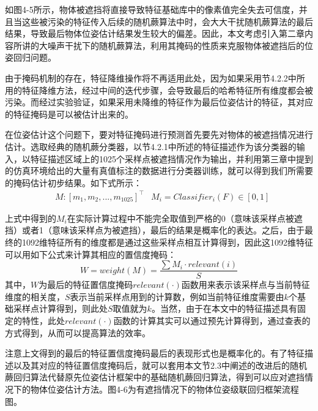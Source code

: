 如图4-5所示，物体被遮挡将直接导致特征基础库中的像素值完全失去可信度，并且当这些被污染的特征传入后续的随机蕨算法中时，会大大干扰随机蕨算法的最后结果，导致最后物体位姿估计结果发生较大的偏差。因此，本文考虑引入第二章内容所讲的大噪声干扰下的随机蕨算法，利用其掩码的性质来克服物体被遮挡后的位姿回归问题。

由于掩码机制的存在，特征降维操作将不再适用此处，因为如果采用节4.2.2中所用的特征降维方法，经过中间的迭代步骤，会导致最后的哈希特征所有维度都会被污染。而经过实验验证，如果采用未降维的特征作为最后位姿估计的特征，其对应的特征掩码是可以被估计出来的。

在位姿估计这个问题下，要对特征掩码进行预测首先要先对物体的被遮挡情况进行估计。选取经典的随机蕨分类器，以节4.2.1中所述的特征描述作为该分类器的输入，以特征描述区域上的1025个采样点被遮挡情况作为输出，并利用第三章中提到的仿真环境给出的大量有真值标注的数据进行分类器训练，就可以得到我们所需要的掩码估计初步结果。如下式所示：
\begin{equation}
\begin{aligned}
	& M: \left[m_1,m_2,...,m_1025\right]^\top
	& M_i=Classifier_i(F)\in[0,1]
\end{aligned}
\end{equation}

上式中得到的$M_i$在实际计算过程中不能完全取值到严格的0（意味该采样点被遮挡）或者1（意味该采样点为被遮挡），最后的结果是概率化的表达。之后，由于最终的1092维特征所有的维度都是通过这些采样点相互计算得到，因此这1092维特征可以用如下公式来计算其相应的置信度掩码：
\begin{equation}
	W=weight(M)=\frac{\sum M_i\cdot relevant(i)}{S}
\end{equation}
其中，$W$为最后的特征置信度掩码$relevant(\cdot)$函数用来表示该采样点与当前特征维度的相关度，$S$表示当前采样点用到的计算数，例如当前特征维度需要由$k$个基础采样点计算得到，则此处$S$取值就为$k$。当然，由于在本文中的特征描述具有固定的特性，此处$relevant(\cdot)$函数的计算其实可以通过预先计算得到，通过查表的方式得到，从而可以提高算法的效率。

注意上文得到的最后的特征置信度掩码最后的表现形式也是概率化的。有了特征描述以及其对应的特征置信度掩码后，就可以套用本文节2.3中阐述的改进后的随机蕨回归算法代替原先位姿估计框架中的基础随机蕨回归算法，得到可以应对遮挡情况下的物体位姿估计方法。图4-6为有遮挡情况下的物体位姿级联回归框架流程图。

